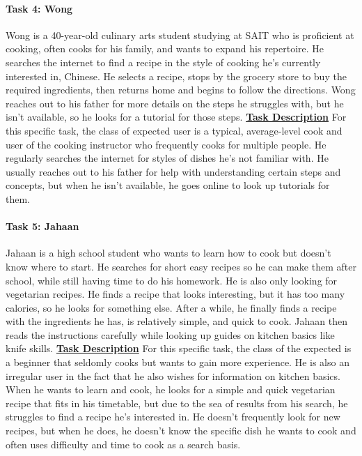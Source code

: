 \documentclass[11pt,english]{article}
\begin{document}
\paragraph{Task 4: Wong}
Wong is a 40-year-old culinary arts student studying at SAIT who is proficient at cooking, often cooks for his family, and wants to expand his repertoire. He searches the internet to find a recipe in the style of cooking he’s currently interested in, Chinese. He selects a recipe, stops by the grocery store to buy the required ingredients, then returns home and begins to follow the directions. Wong reaches out to his father for more details on the steps he struggles with, but he isn’t available, so he looks for a tutorial for those steps.
\newline
\newline
\textbf{\underline{Task Description}}
\newline
\newline
For this specific task, the class of expected user is a typical, average-level cook and user of the cooking instructor who frequently cooks for multiple people. He regularly searches the internet for styles of dishes he’s not familiar with. He usually reaches out to his father for help with understanding certain steps and concepts, but when he isn’t available, he goes online to look up tutorials for them.
\newline
\paragraph{Task 5: Jahaan}
Jahaan is a high school student who wants to learn how to cook but doesn’t know where to start. He searches for short easy recipes so he can make them after school, while still having time to do his homework. He is also only looking for vegetarian recipes. He finds a recipe that looks interesting, but it has too many calories, so he looks for something else. After a while, he finally finds a recipe with the ingredients he has, is relatively simple, and quick to cook. Jahaan then reads the instructions carefully while looking up guides on kitchen basics like knife skills. 
\newline
\newline
\textbf{\underline{Task Description}}
\newline
\newline
For this specific task, the class of the expected is a beginner that seldomly cooks but wants to gain more experience. He is also an irregular user in the fact that he also wishes for information on kitchen basics. When he wants to learn and cook, he looks for a simple and quick vegetarian recipe that fits in his timetable, but due to the sea of results from his search, he struggles to find a recipe he’s interested in. He doesn’t frequently look for new recipes, but when he does, he doesn’t know the specific dish he wants to cook and often uses difficulty and time to cook as a search basis.
\newline
\newpage
\end{document}
